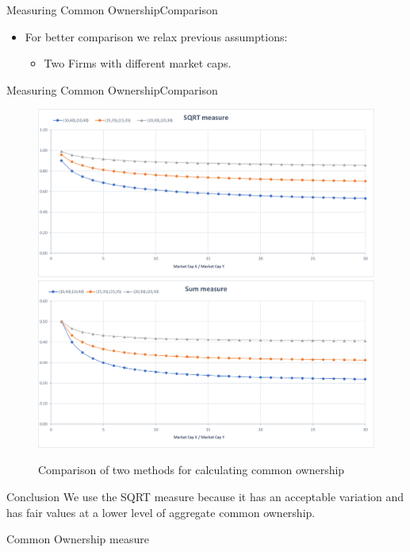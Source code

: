 \documentclass[handout]{beamer}
\begin{document}
			
			
			\begin{frame}{Measuring Common Ownership}{Comparison}
				\begin{itemize}
					\item For better comparison we relax previous assumptions:
					\begin{itemize}
						\item Two Firms with different market caps.
					\end{itemize}
				\end{itemize}
				\resizebox{0.7\textwidth}{!}
				{
					
				}
				
				
			\end{frame}
			
			
			\begin{frame}{Measuring Common Ownership}{Comparison}
				\begin{figure}[htbp]
					\includegraphics[width=0.47\linewidth]{Elements/3.png}
					\includegraphics[width=0.47\linewidth]{Elements/4.png}
					\captionsetup{labelformat=empty}
					\caption{\scriptsize Comparison of two methods for calculating common ownership}
				\end{figure}
				\begin{block}{Conclusion}
					We use the SQRT measure because it has an acceptable variation and has fair values at a lower level of aggregate common ownership. 
				\end{block}
			\end{frame}
		\begin{frame}{Common Ownership measure}	
			\begin{table}[htbp]
						\centering
					\resizebox{1\textwidth}{!}{
						}
			\end{table}
		\end{frame}	
		
\end{document}
